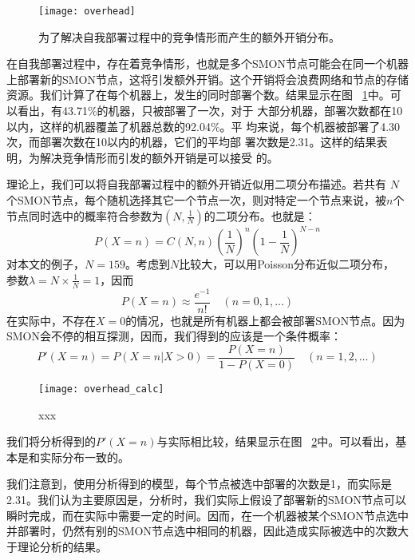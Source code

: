 \begin{figure}
\centering
  \begin{minipage}{0.8\linewidth}
    \centering
    \texttt{[image: overhead]}
    \caption{为了解决自我部署过程中的竞争情形而产生的额外开销分布。}
    \label{fig:overhead}
  \end{minipage}
\end{figure}

在自我部署过程中，存在着竞争情形，也就是多个SMON节点可能会在同一个机器
上部署新的SMON节点，这将引发额外开销。这个开销将会浪费网络和节点的存储
资源。我们计算了在每个机器上，发生的同时部署个数。结果显示在图~
\ref{fig:overhead}中。可以看出，有43.71\%的机器，只被部署了一次，对于
大部分机器，部署次数都在10以内，这样的机器覆盖了机器总数的92.04\%。平
均来说，每个机器被部署了4.30次，而部署次数在10以内的机器，它们的平均部
署次数是2.31。这样的结果表明，为解决竞争情形而引发的额外开销是可以接受
的。

理论上，我们可以将自我部署过程中的额外开销近似用二项分布描述。若共有
$N$个SMON节点，每个随机选择其它一个节点一次，则对特定一个节点来说，被$n$个
节点同时选中的概率符合参数为$(N, \frac{1}{N})$的二项分布。也就是：
\begin{equation*}
P(X=n) = C(N, n) (\frac{1}{N})^n (1 - \frac{1}{N})^{N-n}
\end{equation*}
对本文的例子，$N=159$。考虑到$N$比较大，可以用Poisson分布近似二项分布，
参数$\lambda = N \times \frac{1}{N} = 1$，因而
\begin{equation*}
P(X=n) \approx \frac{e^{-1}}{n!} \quad (n = 0, 1, \ldots )
\end{equation*}
在实际中，不存在$X=0$的情况，也就是所有机器上都会被部署SMON节点。因为
SMON会不停的相互探测，因而，我们得到的应该是一个条件概率：
\begin{equation*}
P'(X=n) = P(X=n | X > 0) = \frac{P(X=n)}{1- P(X=0)} \quad (n = 1, 2, \ldots )
\end{equation*}

\begin{figure}
\centering
  \begin{minipage}{0.8\linewidth}
    \centering
    \texttt{[image: overhead\_calc]}
    \caption{xxx}
    \label{fig:overhead_calc}
  \end{minipage}
\end{figure}

我们将分析得到的$P'(X=n)$与实际相比较，结果显示在图~
\ref{fig:overhead_calc}中。可以看出，基本是和实际分布一致的。

我们注意到，使用分析得到的模型，每个节点被选中部署的次数是1，而实际是
2.31。我们认为主要原因是，分析时，我们实际上假设了部署新的SMON节点可以
瞬时完成，而在实际中需要一定的时间。因而，在一个机器被某个SMON节点选中
并部署时，仍然有别的SMON节点选中相同的机器，因此造成实际被选中的次数大
于理论分析的结果。

